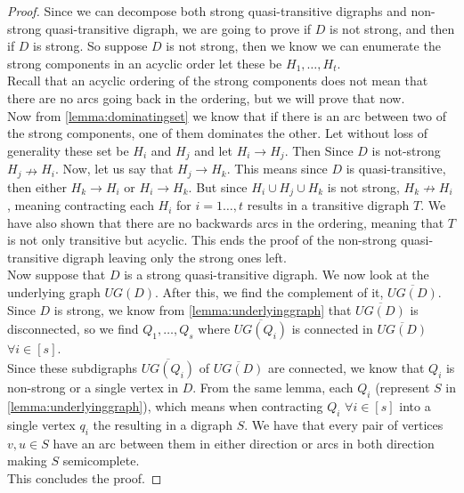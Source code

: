 \begin{proof}
    Since we can decompose both strong quasi-transitive digraphs and non-strong quasi-transitive digraph, we are going to prove if $D$ is not strong, and then if $D$ is strong.
    So suppose $D$ is not strong, then we know we can enumerate the strong components in an acyclic order let these be $H_1,\dots , H_t$. \\
    Recall that an acyclic ordering of the strong components does not mean that there are no arcs going back in the ordering, but we will prove that now. \\
    Now from \autoref{lemma:dominatingset} we know that if there is an arc between two of the strong components, one of them dominates the other.
    Let without loss of generality these set be $H_i$ and $H_j$ and let $H_i\rightarrow H_j$. 
    Then Since $D$ is not-strong $H_j\nrightarrow H_i$. 
    Now, let us say that $H_j \rightarrow H_k$. 
    This means since $D$ is quasi-transitive, then either $H_k\rightarrow H_i$ or $H_i \rightarrow H_k$. 
    But since $H_i\cup H_j \cup H_k$ is not strong, $H_k\nrightarrow H_i$, meaning contracting each $H_i$ for $i=1\dots,t$ results in a transitive digraph $T$. 
    We have also shown that there are no backwards arcs in the ordering, meaning that $T$ is not only transitive but acyclic. 
    This ends the proof of the non-strong quasi-transitive digraph leaving only the strong ones left.\\

    Now suppose that $D$ is a strong quasi-transitive digraph. 
    We now look at the underlying graph $UG(D)$. 
    After this, we find the complement of it, $\overline{UG(D)}$. 
    Since $D$ is strong, we know from \autoref{lemma:underlyinggraph} that $\overline{UG(D)}$ is disconnected, so we find $Q_1,\dots , Q_s$ where $\overline{UG(Q_i)}$ is connected in $\overline{UG(D)}$ $\forall i \in [s]$.\\ 
    Since these subdigraphs $\overline{UG(Q_i)}$ of $\overline{UG(D)}$ are connected, we know that $Q_i$ is non-strong or a single vertex in $D$. 
    From the same lemma, each $Q_i$ (represent $S$ in \autoref{lemma:underlyinggraph}), which means when contracting $Q_i$ $\forall i\in [s]$ into a single vertex $q_i$ the resulting in a digraph $S$. 
    We have that every pair of vertices $v,u \in S$ have an arc between them in either direction or arcs in both direction making $S$ semicomplete. \\
    This concludes the proof.
\end{proof}
